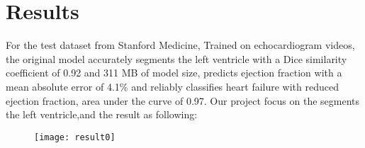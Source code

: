 \vfill
\section{Results}

For the test dataset from Stanford Medicine, Trained on echocardiogram videos, the original model accurately segments the left ventricle with a Dice similarity coefficient of 0.92 and 311 MB of model size, predicts ejection fraction with a mean absolute error of 4.1\% and reliably classifies heart failure with reduced ejection fraction, area under the curve of 0.97. Our project focus on the segments the left ventricle,and the result as following:

\begin{figure}[h]
\centering
\texttt{[image: result0]}
\label{result}
\end{figure}
